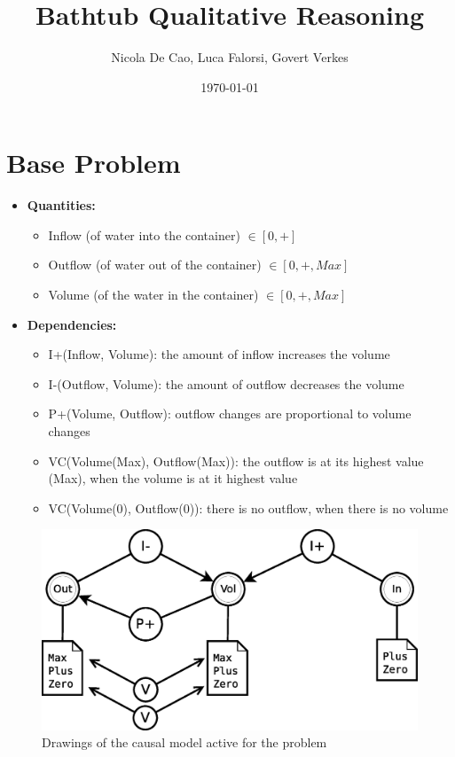 \documentclass[a4paper]{article}
\title{Bathtub Qualitative Reasoning}
\author{Nicola De Cao, Luca Falorsi, Govert Verkes}
\date{\today}
\begin{document}
\maketitle

\section{Base Problem}

\begin{itemize}
\item \textbf{Quantities:}
\begin{itemize}
\item Inflow (of water into the container) $\in [0, +]$
\item Outflow (of water out of the container) $\in [0, +, Max]$
\item Volume (of the water in the container) $\in [0, +, Max]$
\end{itemize}

\item \textbf{Dependencies:}

\begin{itemize}
\item I+(Inflow, Volume): the amount of inflow increases the volume
\item I-(Outflow, Volume): the amount of outflow decreases the volume
\item P+(Volume, Outflow): outflow changes are proportional to volume changes
\item VC(Volume(Max), Outflow(Max)): the outflow is at its highest value (Max), when the volume is at it highest value
\item VC(Volume(0), Outflow(0)): there is no outflow, when there is no volume
\end{itemize}
\end{itemize}


\begin{figure}[H]
\centering
\includegraphics[scale=0.5]{problem1.eps}
\caption{Drawings of the causal model active for the problem}
\end{figure}
\end{document}
